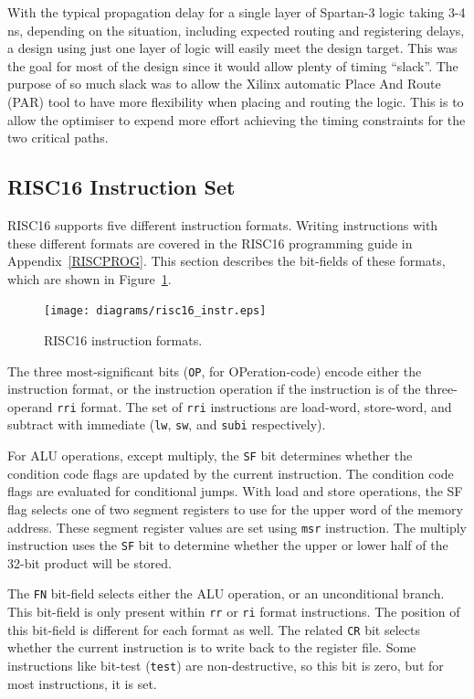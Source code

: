 With the typical propagation delay for a single layer of Spartan-3 logic taking
3-4 ns, depending on the situation, including expected routing and registering
delays, a design using just one layer of logic will easily meet the design
target. This was the goal for most of the design since it would allow plenty of
timing ``slack''. The purpose of so much slack was to allow the Xilinx automatic
Place And Route (PAR) tool to have more flexibility when placing and routing the
logic. This is to allow the optimiser to expend more effort achieving the timing
constraints for the two critical paths.


\subsection{RISC16 Instruction Set}
RISC16 supports five different instruction formats. Writing instructions with
these different formats are covered in the RISC16 programming guide in
Appendix~\ref{RISCPROG}. This section describes the bit-fields of these formats,
which are shown in Figure~\ref{RISC16_Instructions}.

\begin{figure}[h!]
\begin{center}
\texttt{[image: diagrams/risc16\_instr.eps]}
\caption[RISC16 instruction formats]{RISC16 instruction formats.}
\label{RISC16_Instructions}
\end{center}
\end{figure}

The three most-significant bits (\texttt{OP}, for OPeration-code) encode either
the instruction format, or the instruction operation if the instruction is of
the three-operand \texttt{rri} format. The set of \texttt{rri} instructions are
load-word, store-word, and subtract with immediate (\texttt{lw}, \texttt{sw}, and
\texttt{subi} respectively).

For ALU operations, except multiply, the \texttt{SF} bit determines whether the
condition code flags are updated by the current instruction. The condition code
flags are evaluated for conditional jumps. With load and store operations, the SF
flag selects one of two segment registers to use for the upper word of the memory
address. These segment register values are set using \texttt{msr} instruction.
The multiply instruction uses the \texttt{SF} bit to determine whether the upper
or lower half of the 32-bit product will be stored.

The \texttt{FN} bit-field selects either the ALU operation, or an unconditional
branch. This bit-field is only present within \texttt{rr} or \texttt{ri} format
instructions. The position of this bit-field is different for each format as
well. The related \texttt{CR} bit selects whether the current instruction is to
write back to the register file. Some instructions like bit-test (\texttt{test})
are non-destructive, so this bit is zero, but for most instructions, it is set.

